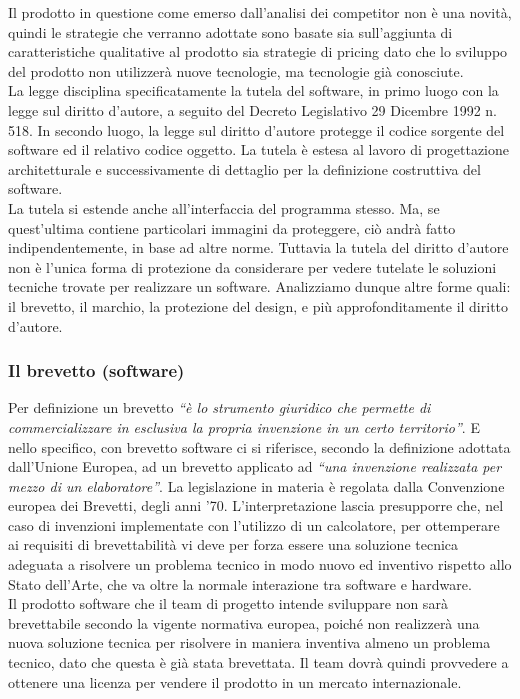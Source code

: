 Il prodotto in questione come emerso dall\textquoteright{}analisi dei competitor non è una novità, quindi le strategie che verranno adottate sono basate sia sull'aggiunta di caratteristiche qualitative al prodotto sia strategie di pricing dato che lo sviluppo del prodotto non utilizzerà nuove tecnologie, ma tecnologie già conosciute. \\
La legge disciplina specificatamente la tutela del software, in primo luogo con la legge sul diritto d'autore, a seguito del Decreto Legislativo 29 Dicembre 1992 n. 518. In secondo luogo, la legge sul diritto d'autore protegge il codice sorgente del software ed il relativo codice oggetto. La tutela è estesa al lavoro di progettazione architetturale e successivamente di dettaglio per la definizione costruttiva del software.\\
La tutela si estende anche all'interfaccia del programma stesso. Ma, se quest'ultima contiene particolari immagini da proteggere, ciò andrà fatto indipendentemente, in base ad altre norme. Tuttavia la tutela del diritto d'autore non è l'unica forma di protezione da considerare per vedere tutelate le soluzioni tecniche trovate per realizzare un software. Analizziamo dunque altre forme quali: il brevetto, il marchio, la protezione del design, e più approfonditamente il diritto d'autore.

\subsubsection{Il brevetto (software)}
Per definizione un brevetto \textit{``è lo strumento giuridico che permette di commercializzare in esclusiva la propria invenzione in un certo territorio''}. E nello specifico, con brevetto software ci si riferisce, secondo la definizione adottata dall'Unione Europea, ad un brevetto applicato ad \textit{``una invenzione realizzata per mezzo di un elaboratore''}. La legislazione in materia è regolata dalla Convenzione europea dei Brevetti, degli anni '70. L'interpretazione lascia presupporre che, nel caso di invenzioni implementate con l'utilizzo di un calcolatore, per ottemperare ai requisiti di brevettabilità vi deve per forza essere una soluzione tecnica adeguata a risolvere un problema tecnico in modo nuovo ed inventivo rispetto allo Stato dell'Arte, che va oltre la normale interazione tra software e hardware.\\
Il prodotto software che il team di progetto intende sviluppare non sarà brevettabile secondo la vigente normativa europea, poiché non realizzerà una nuova soluzione tecnica per risolvere in maniera inventiva almeno un problema tecnico, dato che questa è già stata brevettata. Il team dovrà quindi provvedere a ottenere una licenza per vendere il prodotto in un mercato internazionale.

